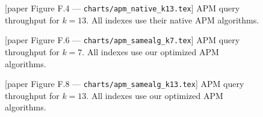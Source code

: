\documentclass[letterpaper,10pt,twocolumn]{article}
\begin{document}
\begin{figure}[p]
\centering

\caption{\textup{[paper Figure F.3 --- \texttt{charts/apm\_native\_k10.tex}]} APM query
throughput for $k = 10$. All indexes use their native APM algorithms.}
\label{fig:apm_native_k10}


\caption{\textup{[paper Figure F.4 --- \texttt{charts/apm\_native\_k13.tex}]} APM query
throughput for $k = 13$. All indexes use their native APM algorithms.}
\label{fig:apm_native_k13}
\end{figure}

\begin{figure}[p]
\centering

\caption{\textup{[paper Figure F.5 --- \texttt{charts/apm\_samealg\_k4.tex}]} APM query
throughput for $k = 4$. All indexes use our optimized APM algorithms.}
\label{fig:apm_same_alg_k4}


\caption{\textup{[paper Figure F.6 --- \texttt{charts/apm\_samealg\_k7.tex}]} APM query
throughput for $k = 7$. All indexes use our optimized APM algorithms.}
\label{fig:apm_same_alg_k7}
\end{figure}

\begin{figure}[p]
\centering

\caption{\textup{[paper Figure F.7 --- \texttt{charts/apm\_samealg\_k10.tex}]} APM query
throughput for $k = 10$. All indexes use our optimized APM algorithms.}
\label{fig:apm_same_alg_k10}


\caption{\textup{[paper Figure F.8 --- \texttt{charts/apm\_samealg\_k13.tex}]} APM query
throughput for $k = 13$. All indexes use our optimized APM algorithms.}
\label{fig:apm_same_alg_k13}
\end{figure}


\end{document}

